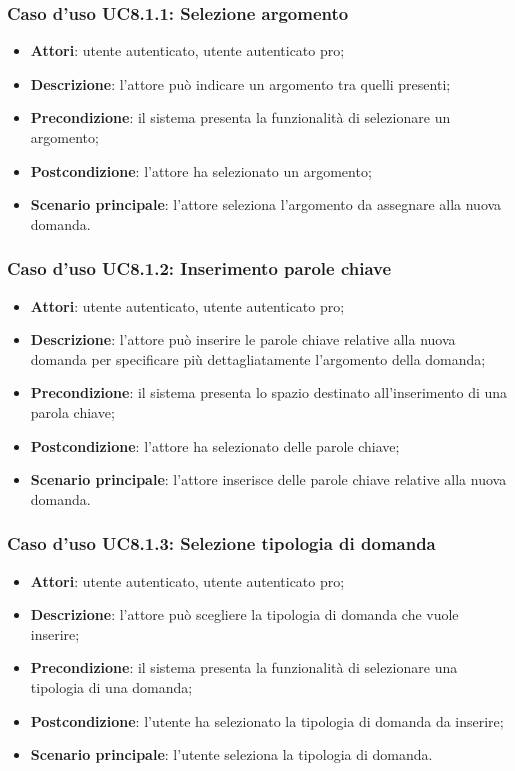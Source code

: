 	\subsubsection{Caso d'uso UC8.1.1: Selezione argomento}
	\begin{itemize}
		\item
			\textbf{Attori}: utente autenticato, utente autenticato pro;
		\item
			\textbf{Descrizione}: l'attore può indicare un argomento tra quelli presenti;
		\item		
			\textbf{Precondizione}: il sistema presenta la funzionalità di selezionare un argomento;
		\item
			\textbf{Postcondizione}: l'attore ha selezionato un argomento;
		\item
			\textbf{Scenario principale}: l'attore seleziona l'argomento da assegnare alla nuova domanda.		
	\end{itemize}
		
	\subsubsection{Caso d'uso UC8.1.2: Inserimento parole chiave}
	\begin{itemize}
		\item
			\textbf{Attori}: utente autenticato, utente autenticato pro;
		\item
			\textbf{Descrizione}: l'attore può inserire le parole chiave relative alla nuova domanda per specificare più dettagliatamente l'argomento della domanda;
		\item		
			\textbf{Precondizione}: il sistema presenta lo spazio destinato all'inserimento di una parola chiave;
		\item
			\textbf{Postcondizione}: l'attore ha selezionato delle parole chiave;
		\item
			\textbf{Scenario principale}: l'attore inserisce delle parole chiave relative alla nuova domanda.	
	\end{itemize}


	\subsubsection{Caso d'uso UC8.1.3: Selezione tipologia di domanda}
	\begin{itemize}
		\item
			\textbf{Attori}: utente autenticato, utente autenticato pro;
		\item
			\textbf{Descrizione}: l'attore può scegliere la tipologia di domanda che vuole inserire;
		\item		
			\textbf{Precondizione}: il sistema presenta la funzionalità di selezionare una tipologia di una domanda;
		\item
			\textbf{Postcondizione}: l'utente ha selezionato la tipologia di domanda da inserire;
		\item 
			\textbf{Scenario principale}: l'utente seleziona la tipologia di domanda.
	\end{itemize}

